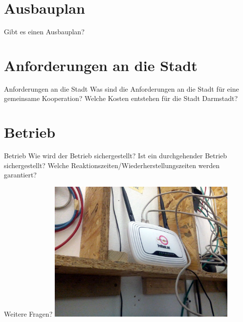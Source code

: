 \documentclass{beamer}
\begin{document}
\section{Ausbauplan}
\begin{frame}{}
Gibt es einen Ausbauplan?
\end{frame}

\section{Anforderungen an die Stadt}
\begin{frame}{Anforderungen an die Stadt}
Was sind die Anforderungen an die Stadt für eine gemeinsame Kooperation?
Welche Kosten entstehen für die Stadt Darmstadt?
\end{frame}

\section{Betrieb}
\begin{frame}{Betrieb}
Wie wird der Betrieb sichergestellt?
Ist ein durchgehender Betrieb sichergestellt?
Welche Reaktionszeiten/Wiederherstellungszeiten werden garantiert?
\end{frame}










\begin{frame}{Weitere Fragen?}
\vfill
\centering
\includegraphics[width=0.7\textwidth]{images/irl_router}
\vfill
\end{frame}
\end{document}
